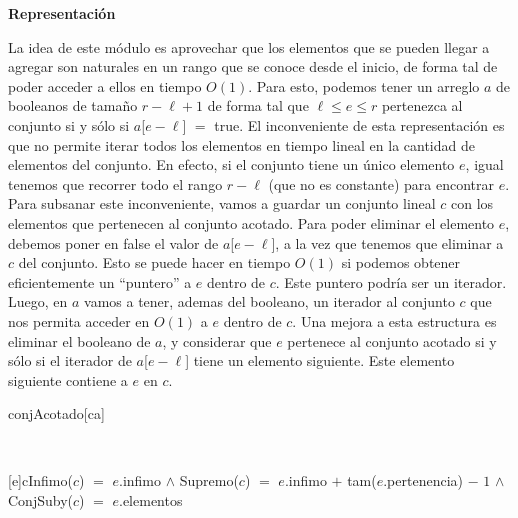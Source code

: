 \documentclass[a4paper,10pt]{article}
\newenvironment{Representacion}{%
  \vspace*{2ex}%
  \noindent\textbf{\Large Representación}%
  \vspace*{2ex}%
}{}
\begin{document}
{\begin{Representacion}
  La idea de este módulo es aprovechar que los elementos que se pueden llegar a agregar son naturales en un rango que se conoce desde el inicio, de forma tal de poder acceder a ellos en tiempo $O(1)$.  Para esto, podemos tener un arreglo $a$ de booleanos de tamaño $r - \ell + 1$ de forma tal que $\ell \leq e \leq r$ pertenezca al conjunto si y sólo si $a$[$e-\ell$] $=$ true.  El inconveniente de esta representación es que no permite iterar todos los elementos en tiempo lineal en la cantidad de elementos del conjunto.  En efecto, si el conjunto tiene un único elemento $e$, igual tenemos que recorrer todo el rango $r - \ell$ (que no es constante) para encontrar $e$.  Para subsanar este inconveniente, vamos a guardar un conjunto lineal $c$ con los elementos que pertenecen al conjunto acotado.  Para poder eliminar el elemento $e$, debemos poner en false el valor de $a$[$e-\ell$], a la vez que tenemos que eliminar a $c$ del conjunto.  Esto se puede hacer en tiempo $O(1)$ si podemos obtener eficientemente un ``puntero'' a $e$ dentro de $c$.  Este puntero podría ser un iterador.  Luego, en $a$ vamos a tener, ademas del booleano, un iterador al conjunto $c$ que nos permita acceder en $O(1)$ a $e$ dentro de $c$.  Una mejora a esta estructura es eliminar el booleano de $a$, y considerar que $e$ pertenece al conjunto acotado si y sólo si el iterador de $a$[$e - \ell$] tiene un elemento siguiente.  Este elemento siguiente contiene a $e$ en $c$.

  \begin{Estructura}{conjAcotado}[ca]
    \begin{Tupla}[ca]%
    \end{Tupla}
  \end{Estructura}

  \mbox{}

  ~

  [e]{c}{Infimo($c$) $=$ $e$.infimo $\land$ Supremo($c$) $=$ $e$.infimo $+$ tam($e$.pertenencia) $-$ $1$ $\land$\\ ConjSuby($c$) $=$ $e$.elementos}



\end{Representacion}}
\end{document}
